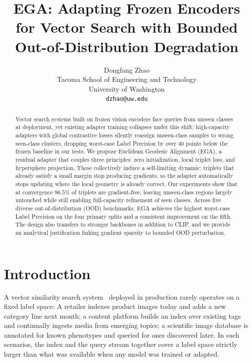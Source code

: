 \documentclass{article}
\title{EGA: Adapting Frozen Encoders for Vector Search with Bounded Out-of-Distribution Degradation}
\author{%
  Dongfang Zhao \\
  Tacoma School of Engineering and Technology\\
  University of Washington\\
  \texttt{dzhao@uw.edu} \\
}
\begin{document}
\maketitle

\begin{abstract}
Vector search systems built on frozen vision encoders face queries from unseen classes at deployment, yet existing adapter training collapses under this shift: high-capacity adapters with global contrastive losses silently reassign unseen-class samples to wrong seen-class clusters, dropping worst-case Label Precision by over 40 points below the frozen baseline in our tests.
We propose Euclidean Geodesic Alignment (EGA), a residual adapter that couples three principles: zero initialization, local triplet loss, and hypersphere projection.
These collectively induce a self-limiting dynamic: triplets that already satisfy a small margin stop producing gradients, so the adapter automatically stops updating where the local geometry is already correct.
Our experiments show that at convergence $96.5\%$ of triplets are gradient-free, leaving unseen-class regions largely untouched while still enabling full-capacity refinement of seen classes.
Across five diverse out-of-distribution (OOD) benchmarks, EGA achieves the highest worst-case Label Precision on the four primary splits and a consistent improvement on the fifth.
The design also transfers to stronger backbones in addition to CLIP, and we provide an analytical justification linking gradient sparsity to bounded OOD perturbation.
\end{abstract}

\section{Introduction}

A vector similarity search system~\cite{johnson2019billion,subramanya2019diskann,chen2021spann,osdi25pipeann} deployed in production rarely operates on a fixed label space:
A retailer indexes product images today and adds a new category line next month; a content platform builds an index over existing tags and continually ingests media from emerging topics; a scientific image database is annotated for known phenotypes and queried for ones discovered later.
In such scenarios, the index and the query stream together cover a label space strictly larger than what was available when any model was trained or adapted.
\end{document}
